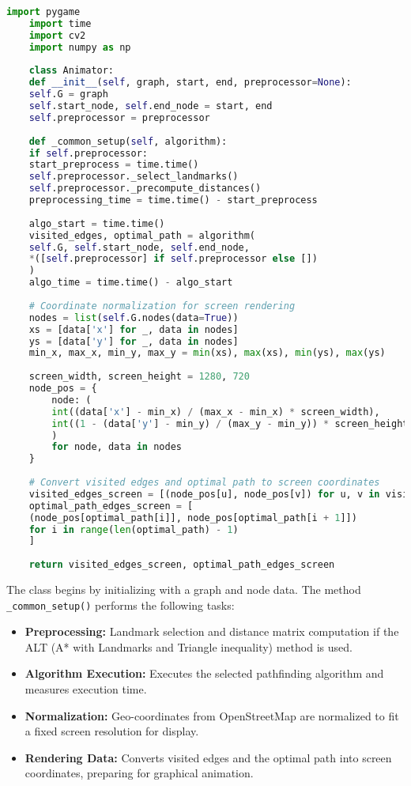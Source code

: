 \begin{lstlisting}[language=Python, caption=Core logic of Animator class]
	import pygame
	import time
	import cv2
	import numpy as np
	
	class Animator:
	def __init__(self, graph, start, end, preprocessor=None):
	self.G = graph
	self.start_node, self.end_node = start, end
	self.preprocessor = preprocessor
	
	def _common_setup(self, algorithm):
	if self.preprocessor:
	start_preprocess = time.time()
	self.preprocessor._select_landmarks()
	self.preprocessor._precompute_distances()
	preprocessing_time = time.time() - start_preprocess
	
	algo_start = time.time()
	visited_edges, optimal_path = algorithm(
	self.G, self.start_node, self.end_node,
	*([self.preprocessor] if self.preprocessor else [])
	)
	algo_time = time.time() - algo_start
	
	# Coordinate normalization for screen rendering
	nodes = list(self.G.nodes(data=True))
	xs = [data['x'] for _, data in nodes]
	ys = [data['y'] for _, data in nodes]
	min_x, max_x, min_y, max_y = min(xs), max(xs), min(ys), max(ys)
	
	screen_width, screen_height = 1280, 720
	node_pos = {
		node: (
		int((data['x'] - min_x) / (max_x - min_x) * screen_width),
		int((1 - (data['y'] - min_y) / (max_y - min_y)) * screen_height)
		)
		for node, data in nodes
	}
	
	# Convert visited edges and optimal path to screen coordinates
	visited_edges_screen = [(node_pos[u], node_pos[v]) for u, v in visited_edges]
	optimal_path_edges_screen = [
	(node_pos[optimal_path[i]], node_pos[optimal_path[i + 1]])
	for i in range(len(optimal_path) - 1)
	]
	
	return visited_edges_screen, optimal_path_edges_screen
\end{lstlisting}
The class begins by initializing with a graph and node data. The method \texttt{\_common\_setup()} performs the following tasks:
\begin{itemize}
	\item \textbf{Preprocessing:} Landmark selection and distance matrix computation if the ALT (A* with Landmarks and Triangle inequality) method is used.
	\item \textbf{Algorithm Execution:} Executes the selected pathfinding algorithm and measures execution time.
	\item \textbf{Normalization:} Geo-coordinates from OpenStreetMap are normalized to fit a fixed screen resolution for display.
	\item \textbf{Rendering Data:} Converts visited edges and the optimal path into screen coordinates, preparing for graphical animation.
\end{itemize}
